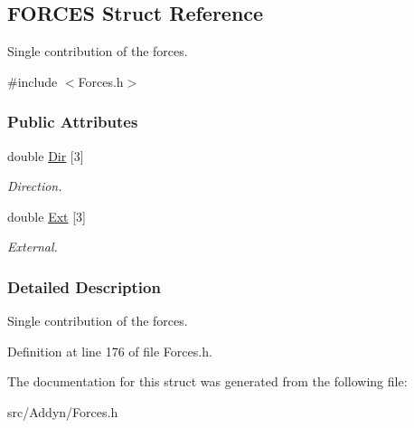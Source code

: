 \hypertarget{structFORCES}{}\subsection{F\+O\+R\+C\+ES Struct Reference}
\label{structFORCES}


Single contribution of the forces.  




{\ttfamily \#include $<$Forces.\+h$>$}

\subsubsection*{Public Attributes}
\begin{DoxyCompactItemize}
\item 
double \hyperlink{structFORCES_ac77c91979738079508cf3f257a7164ba}{Dir} \mbox{[}3\mbox{]}\hypertarget{structFORCES_ac77c91979738079508cf3f257a7164ba}{}\label{structFORCES_ac77c91979738079508cf3f257a7164ba}

\begin{DoxyCompactList}\small\item\em Direction. \end{DoxyCompactList}\item 
double \hyperlink{structFORCES_a034ef504c45f9a730ddb6053df710a38}{Ext} \mbox{[}3\mbox{]}\hypertarget{structFORCES_a034ef504c45f9a730ddb6053df710a38}{}\label{structFORCES_a034ef504c45f9a730ddb6053df710a38}

\begin{DoxyCompactList}\small\item\em External. \end{DoxyCompactList}\end{DoxyCompactItemize}


\subsubsection{Detailed Description}
Single contribution of the forces. 

Definition at line 176 of file Forces.\+h.



The documentation for this struct was generated from the following file\+:\begin{DoxyCompactItemize}
\item 
src/\+Addyn/Forces.\+h\end{DoxyCompactItemize}
